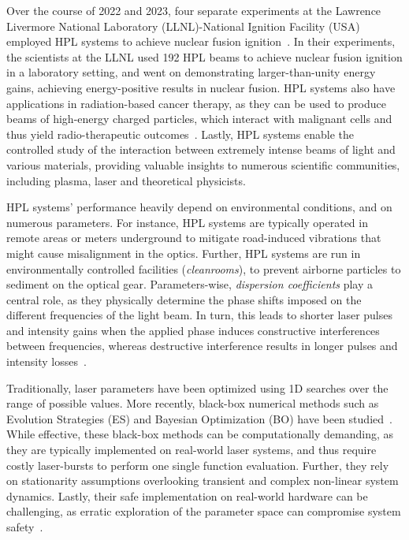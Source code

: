 Over the course of 2022 and 2023, four separate experiments at the Lawrence Livermore National Laboratory (LLNL)-National Ignition Facility (USA) employed HPL systems to achieve nuclear fusion ignition~\citep{abu2024achievement}. In their experiments, the scientists at the LLNL used 192 HPL beams to achieve nuclear fusion ignition in a laboratory setting, and went on demonstrating larger-than-unity energy gains, achieving energy-positive results in nuclear fusion. HPL systems also have applications in radiation-based cancer therapy, as they can be used to produce beams of high-energy charged particles, which interact with malignant cells and thus yield radio-therapeutic outcomes~\citep{grittani2020device}. Lastly, HPL systems enable the controlled study of the interaction between extremely intense beams of light and various materials, providing valuable insights to numerous scientific communities, including plasma, laser and theoretical physicists.

HPL systems' performance heavily depend on environmental conditions, and on numerous parameters. For instance, HPL systems are typically operated in remote areas or meters underground to mitigate road-induced vibrations that might cause misalignment in the optics. Further, HPL systems are run in environmentally controlled facilities (\textit{cleanrooms}), to prevent airborne particles to sediment on the optical gear. 
Parameters-wise, \textit{dispersion coefficients} play a central role, as they physically determine the phase shifts imposed on the different frequencies of the light beam. In turn, this leads to shorter laser pulses and intensity gains when the applied phase induces constructive interferences between frequencies, whereas destructive interference results in longer pulses and intensity losses~\citep{paschotta2008field}.

Traditionally, laser parameters have been optimized using 1D searches over the range of possible values. More recently, black-box numerical methods such as Evolution Strategies (ES) and Bayesian Optimization (BO) have been studied~\citep{loughran2023automated, shalloo2020automation, arteaga2014supercontinuum}. While effective, these black-box methods can be computationally demanding, as they are typically implemented on real-world laser systems, and thus require costly laser-bursts to perform one single function evaluation. Further, they rely on stationarity assumptions overlooking transient and complex non-linear system dynamics. Lastly, their safe implementation on real-world hardware can be challenging, as erratic exploration of the parameter space can compromise system safety~\citep{capuano2023temporl}.

